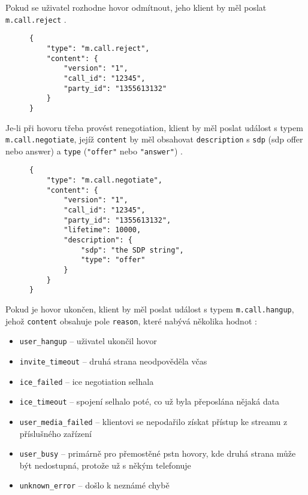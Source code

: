 Pokud se uživatel rozhodne hovor odmítnout, jeho klient by měl poslat
\texttt{m.call.reject} \parencite{GitHub-MSC2746}.

\begin{figure}[H]
    \begin{verbatim}
{
	"type": "m.call.reject",
	"content": {
		"version": "1",
		"call_id": "12345",
		"party_id": "1355613132"
	}
}
	\end{verbatim}
\end{figure}

Je-li při hovoru třeba provést renegotiation, klient by měl poslat událost s
typem \texttt{m.call.negotiate}, jejíž \texttt{content} by
měl obsahovat \texttt{description} s \texttt{sdp} (\gls{sdp}
offer nebo answer) a \texttt{type} (\texttt{"offer"} nebo
\texttt{"answer"}) \parencite{GitHub-MSC2746}.

\begin{figure}[H]
    \begin{verbatim}
{
	"type": "m.call.negotiate",
	"content": {
		"version": "1",
		"call_id": "12345",
		"party_id": "1355613132",
		"lifetime": 10000,
		"description": {
			"sdp": "the SDP string",
			"type": "offer"
		}
	}
}
	\end{verbatim}
\end{figure}

Pokud je hovor ukončen, klient by měl poslat událost s typem
\texttt{m.call.hangup}, jehož \texttt{content} obsahuje pole
\texttt{reason}, které nabývá několika hodnot
\parencite{GitHub-MSC2746}:
\begin{itemize}
    \itemsep0em
    \item \texttt{user_hangup} -- uživatel ukončil hovor
    \item \texttt{invite_timeout} -- druhá strana neodpověděla včas
    \item \texttt{ice_failed} -- \gls{ice} negotiation selhala
    \item \texttt{ice_timeout} -- spojení selhalo poté, co už byla
          přeposlána nějaká data
    \item \texttt{user_media_failed} -- klientovi se nepodařilo získat
          přístup ke streamu z příslušného zařízení
    \item \texttt{user_busy} -- primárně pro přemostěné
          \gls{pstn} hovory, kde druhá strana může být nedostupná, protože už s
          někým telefonuje
    \item \texttt{unknown_error} -- došlo k neznámé chybě
\end{itemize}

